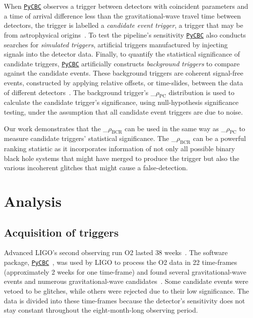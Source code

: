 \documentclass[%
 nofootinbib,
 amsmath,amssymb,
 aps,
 twocolumn
]{revtex4-2}
\newcommand{\pycbc}{{\sc \href{https://pycbc.org/}{\texttt{PyCBC}}}\xspace}
\newcommand{\mathcmd}[1]{{\sc \relax\ifmmode#1\else $#1$\fi}\xspace}
\newcommand{\bcr}{\mathcmd{\rho_\text{BCR}}}
\newcommand{\pycbcstat}{\mathcmd{\rho_\text{PC}}}
\begin{document}
When \pycbc observes a trigger between detectors with coincident parameters and a time of arrival difference less than the gravitational-wave travel time between detectors, the trigger is labelled a \textit{candidate event trigger}, a trigger that may be from astrophysical origins~\cite{pycbc_og1}. To test the pipeline's sensitivity \pycbc also conducts searches for \textit{simulated triggers}, artificial triggers manufactured by injecting signals into the detector data. Finally, to quantify the statistical significance of candidate triggers, \pycbc artificially constructs \textit{background triggers} to compare against the candidate events. These background triggers are coherent signal-free events, constructed by applying relative offsets, or time-slides, between the data of different detectors~\cite{pycbc_og6}. The background trigger's \pycbcstat distribution is used to calculate the candidate trigger's significance,  using null-hypothesis significance testing, under the assumption that all candidate event triggers are due to noise.

Our work demonstrates that the \bcr can be used in the same way as \pycbcstat to measure candidate triggers' statistical significance.  The \bcr can be a powerful ranking statistic as it incorporates information of not only all possible binary black hole systems that might have merged to produce the trigger but also the various incoherent glitches that might cause a false-detection. 

\section{Analysis}\label{sec:Analysis}

\subsection{Acquisition of triggers}
Advanced LIGO's second observing run O2 lasted $38$ weeks~\cite{GWOSC}. The software package, \pycbc~\cite{pycbc_code}, was used by LIGO to process the O2 data in 22 time-frames (approximately 2 weeks for one time-frame) and found several gravitational-wave events and numerous gravitational-wave candidates~\cite{pycbc_og0, pycbc_og1, pycbc_og2, pycbc_og3, pycbc_og4, pycbc_og5, pycbc_og6}. Some candidate events were vetoed to be glitches, while others were rejected due to their low significance. The data is divided into these time-frames because the detector's sensitivity does not stay constant throughout the eight-month-long observing period.
\end{document}
